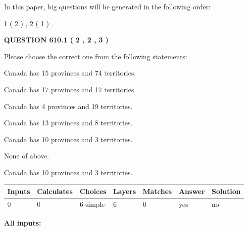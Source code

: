 \documentclass[12pt]{article}
\begin{document}
In this paper, big questions will be generated in the following order: 
   
   
   1 ( 2 )
 ,
   2 ( 1 )
 .
  
\vspace{0.2in}
  
{\textbf{\Large{QUESTION
610.1 
 ( 2 , 2 , 3 )
}}}
  
  
Please choose the correct one from the following statements:
 
 
Canada has  15 provinces and  74 territories.
 
 
Canada has  17 provinces and  17 territories.
 
 
Canada has   4 provinces and  19 territories.
 
 
Canada has  13 provinces and  8 territories.
 
 
Canada has 10  provinces and 3 territories.
 
 
 None of above.
 
 
\noindent{}
 
 
Canada has 10  provinces and 3 territories.
 
 
\noindent{}
 
 
   
   
   
   
\noindent\begin{tabular}{|l|l|l|l|l|l|l|}
 \hline
Inputs & Calculates & Choices & Layers & Matches & Answer & Solution \\ \hline
 0  & 
 0  & 
 6
  simple  
  & 
 6  & 
 0  & 
  yes & 
  no 
  \\ \hline
 \end{tabular}
   
   
   
   
\noindent{}
   
   
   
   
\noindent\vspace{0.1in}\hspace{-0.08in} {\textbf{\Large{All inputs: }}}
   
\end{document}
